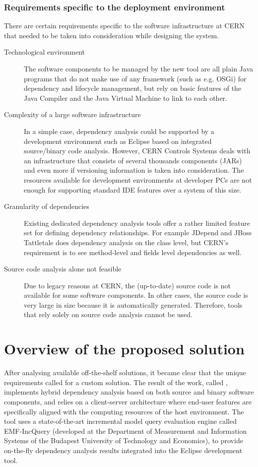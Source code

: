 \subsubsection{Requirements specific to the deployment environment}
There are certain requirements specific to the software infrastructure at CERN
that needed to be taken into consideration while designing the system.

\begin{description}
\item[Technological environment] The software components to be managed by the
new tool are all plain Java programs that do not make use of any framework (such
as e.g. OSGi) for dependency and lifecycle management, but rely on basic
features of the Java Compiler and the Java Virtual Machine to link to each
other.
 
\item[Complexity of a large software infrastructure] In a simple case,
dependency analysis could be supported by a development environment such as
Eclipse based on integrated source/binary code analysis. However, CERN Controls
Systems deals with an infrastructure that consists of several thousands
components (JARs) and even more if versioning information is taken into
consideration. The resources available for development environments at developer
PCs are not enough for supporting standard IDE features over a system of this
size.
 
\item[Granularity of dependencies] Existing dedicated dependency analysis
tools offer a rather limited feature set for defining dependency relationships.
For example JDepend \cite{JDepend} and JBoss Tattletale \cite{Tattletale} does
dependency analysis on the class level, but CERN's requirement is to see
method-level and fields level dependencies as well.

\item[Source code analysis alone not feasible] Due to legacy reasons at CERN,
the (up-to-date) source code is not available for some software components. In
other cases, the source code is very large in size because it is automatically
generated. Therefore, tools that rely solely on source code analysis cannot be
used.

\end{description}

\section{Overview of the proposed solution}
After analysing available off-the-shelf solutions, it became clear that the
unique requirements called for a custom solution. The result of the work, called
\ptool{}, implements hybrid dependency analysis based on both source and binary
software components, and relies on a client-server architecture where end-user
features are specifically aligned with the computing resources of the host
environment. The tool uses a state-of-the-art incremental model query evaluation
engine called EMF-IncQuery (developed at the Department of Measurement and
Information Systems of the Budapest University of Technology and Economics), to
provide on-the-fly dependency analysis results integrated into the Eclipse
development tool.

